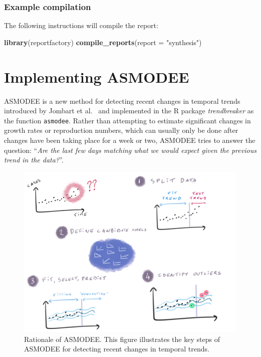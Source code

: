 \documentclass[]{book}
\newenvironment{Shaded}{\begin{snugshade}}{\end{snugshade}}
\newcommand{\DataTypeTok}[1]{\textcolor[rgb]{0.13,0.29,0.53}{#1}}
\newcommand{\KeywordTok}[1]{\textcolor[rgb]{0.13,0.29,0.53}{\textbf{#1}}}
\newcommand{\NormalTok}[1]{#1}
\newcommand{\StringTok}[1]{\textcolor[rgb]{0.31,0.60,0.02}{#1}}
\begin{document}
\hypertarget{example-compilation-2}{%
\subsection{Example compilation}\label{example-compilation-2}}

The following instructions will compile the report:

\begin{Shaded}
\begin{Highlighting}[]

\KeywordTok{library}\NormalTok{(reportfactory)}
\KeywordTok{compile_reports}\NormalTok{(}\DataTypeTok{report =} \StringTok{"synthesis"}\NormalTok{)}
\end{Highlighting}
\end{Shaded}

\hypertarget{asmodee}{%
\chapter{Implementing ASMODEE}\label{asmodee}}

ASMODEE is a new method for detecting recent changes in temporal trends
introduced by Jombart et al.~\citep{Jombart2021-ws} and implemented in the R package
\emph{trendbreaker} \citep{R-trendbreaker} as the function \texttt{asmodee}. Rather than
attempting to estimate significant changes in growth rates or reproduction
numbers, which can usually only be done after changes have been taking place for
a week or two, ASMODEE tries to answer the question: ``\emph{Are the last few days
matching what we would expect given the previous trend in the data?}''.

\begin{figure}

{\centering \includegraphics[width=1\linewidth]{images/asmodee} 

}

\caption{Rationale of ASMODEE. This figure illustrates the key steps of ASMODEE for detecting recent changes in temporal trends.}\label{fig:asmodee}
\end{figure}
\end{document}

